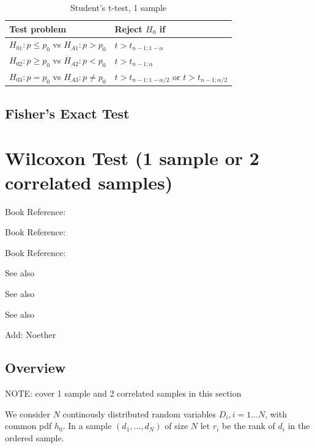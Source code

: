 \begin{table}[ht]
	\centering
	\begin{tabular}{|l|l|}
		\hline
		Test problem & Reject $H_0$ if \\
		\hline
		$H_{01}: p \leq p_0$ vs $H_{A1}: p > p_0$ & $t > t_{n-1;1-\alpha}$ \\
		$H_{02}: p \geq p_0$ vs $H_{A2}: p < p_0$ & $t > t_{n-1;\alpha}$ \\
		$H_{03}: p = p_0$ vs $H_{A3}: p \neq p_0$ & $t > t_{n-1;1-\alpha/2}$ or $t > t_{n-1;\alpha/2}$ \\
		\hline
	\end{tabular}
	\caption{Student's t-test, 1 sample}
	\label{Table1SampleBinomialTest,1 sample}
\end{table}



\subsection{Fisher's Exact Test}



\lipsum[2]



\newpage
\section{Wilcoxon Test (1 sample  or 2 correlated samples)}
\label{1SampleWilcoxonTest}

Book Reference: \cite{Sprent2007}

Book Reference: \cite{Desu2004}

Book Reference: \cite{Hollander_2013}

See also \cite{conover1981}

See also \cite{buening_nonparametric_1978}

See also \cite{bortz_distribution_1990}

Add: Noether

\subsection{Overview}
\label{1SampleWilcoxonTestOverview}

NOTE: cover 1 sample and 2 correlated samples in this section

We consider $N$ continously distributed random variables $D_i,i=1\ldots N$, with common pdf $h_0$. In a sample $(d_1,\ldots,d_N)$ of size $N$ let $r_i$ be the rank of $d_i$ in the ordered sample.

